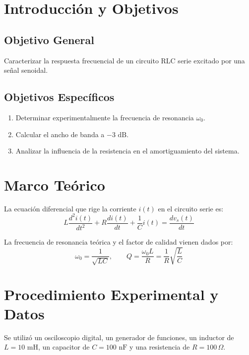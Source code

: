 \documentclass[11pt, letterpaper]{article}
\begin{document}
\section{Introducción y Objetivos}
\subsection{Objetivo General}
Caracterizar la respuesta frecuencial de un circuito RLC serie excitado por una señal senoidal.

\subsection{Objetivos Específicos}
\begin{enumerate}
  \item Determinar experimentalmente la frecuencia de resonancia $\omega_0$.
  \item Calcular el ancho de banda a $-3\text{ dB}$.
  \item Analizar la influencia de la resistencia en el amortiguamiento del sistema.
\end{enumerate}

\section{Marco Teórico}
La ecuación diferencial que rige la corriente $i(t)$ en el circuito serie es:
\begin{equation}
  L \frac{d^2 i(t)}{dt^2} + R \frac{di(t)}{dt} + \frac{1}{C} i(t) = \frac{dv_s(t)}{dt}
\end{equation}

La frecuencia de resonancia teórica y el factor de calidad vienen dados por:
\begin{equation}
  \omega_0 = \frac{1}{\sqrt{LC}}, \qquad Q = \frac{\omega_0 L}{R} = \frac{1}{R} \sqrt{\frac{L}{C}}
\end{equation}

\section{Procedimiento Experimental y Datos}
Se utilizó un osciloscopio digital, un generador de funciones, un inductor de $L = 10\text{ mH}$, un capacitor de $C = 100\text{ nF}$ y una resistencia de $R = 100\,\Omega$.
\end{document}

